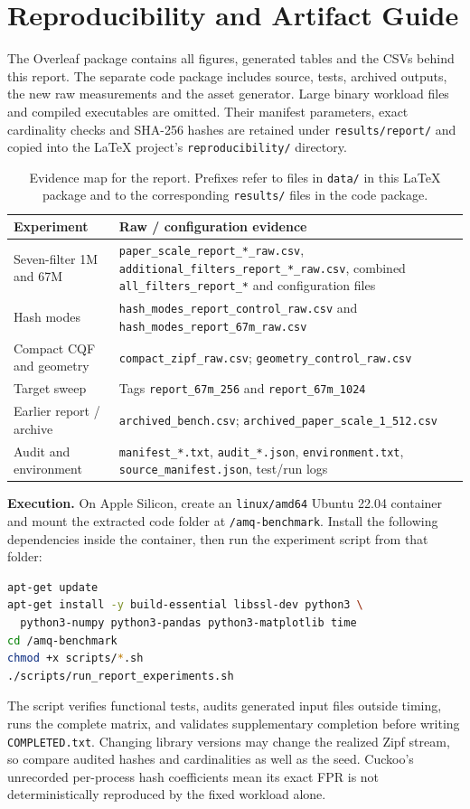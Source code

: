 \section{Reproducibility and Artifact Guide}
\label{app:repro}
The Overleaf package contains all figures, generated tables and the CSVs behind this report. The separate code package includes source, tests, archived outputs, the new raw measurements and the asset generator. Large binary workload files and compiled executables are omitted. Their manifest parameters, exact cardinality checks and SHA-256 hashes are retained under \texttt{results/report/} and copied into the LaTeX project's \texttt{reproducibility/} directory.

\begin{table}[!htbp]\centering\small
\caption{Evidence map for the report. Prefixes refer to files in \texttt{data/} in this LaTeX package and to the corresponding \texttt{results/} files in the code package.}
\begin{tabular}{L{4.0cm}L{8.7cm}}\toprule
\textbf{Experiment}&\textbf{Raw / configuration evidence}\\\midrule
Seven-filter 1M and 67M&\texttt{paper\_scale\_report\_*\_raw.csv}, \texttt{additional\_filters\_report\_*\_raw.csv}, combined \texttt{all\_filters\_report\_*} and configuration files\\
Hash modes&\texttt{hash\_modes\_report\_control\_raw.csv} and \texttt{hash\_modes\_report\_67m\_raw.csv}\\
Compact CQF and geometry&\texttt{compact\_zipf\_raw.csv}; \texttt{geometry\_control\_raw.csv}\\
Target sweep&Tags \texttt{report\_67m\_256} and \texttt{report\_67m\_1024}\\
Earlier report / archive&\texttt{archived\_bench.csv}; \texttt{archived\_paper\_scale\_1\_512.csv}\\
Audit and environment&\texttt{manifest\_*.txt}, \texttt{audit\_*.json}, \texttt{environment.txt}, \texttt{source\_manifest.json}, test/run logs\\\bottomrule
\end{tabular}
\end{table}

\textbf{Execution.} On Apple Silicon, create an \texttt{linux/amd64} Ubuntu 22.04 container and mount the extracted code folder at \texttt{/amq-benchmark}. Install the following dependencies inside the container, then run the experiment script from that folder:
\begin{lstlisting}[language=bash]
apt-get update
apt-get install -y build-essential libssl-dev python3 \
  python3-numpy python3-pandas python3-matplotlib time
cd /amq-benchmark
chmod +x scripts/*.sh
./scripts/run_report_experiments.sh
\end{lstlisting}
The script verifies functional tests, audits generated input files outside timing, runs the complete matrix, and validates supplementary completion before writing \texttt{COMPLETED.txt}. Changing library versions may change the realized Zipf stream, so compare audited hashes and cardinalities as well as the seed. Cuckoo's unrecorded per-process hash coefficients mean its exact FPR is not deterministically reproduced by the fixed workload alone.


